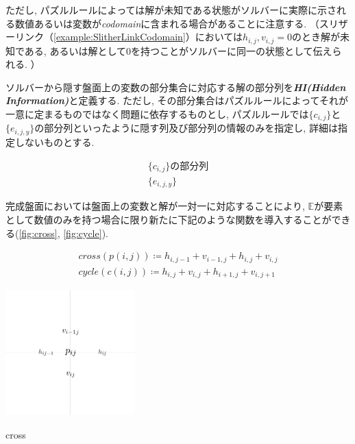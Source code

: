 ただし, パズルルールによっては解が未知である状態がソルバーに実際に示される数値あるいは変数が\textit{codomain}に含まれる場合があることに注意する. （スリザーリンク（\cref{example:SlitherLinkCodomain}）においては$h_{i,j}, v_{i,j} = 0$のとき解が未知である, あるいは解として0を持つことがソルバーに同一の状態として伝えられる. ）

\begin{definition}\label{definition:HiddenInformation}
  ソルバーから隠す盤面上の変数の部分集合に対応する解の部分列を\textbf{\textit{HI(Hidden Information)}}と定義する.
  ただし, その部分集合はパズルルールによってそれが一意に定まるものではなく問題に依存するものとし, パズルルールでは$\{c_{i,j}\}$と$\{e_{i,j,y}\}$の部分列といったように隠す列及び部分列の情報のみを指定し, 詳細は指定しないものとする.
\end{definition}

\begin{example}
  \begin{gather*}
    \{c_{i,j}\}の部分列 \\
    \{e_{i,j,y}\}
  \end{gather*}
\end{example}

完成盤面においては盤面上の変数と解が一対一に対応することにより, $\mathbb{E}$が要素として数値のみを持つ場合に限り新たに下記のような関数を導入することができる(\cref{fig:cross}, \cref{fig:cycle}).

\begin{definition}\label{definition:Function}
  \begin{gather*}
    \textit{cross}(p(i,j))\coloneqq h_{i,j-1}+v_{i-1,j}+h_{i,j}+v_{i,j} \\
    \textit{cycle}(c(i,j))\coloneqq h_{i,j}+v_{i,j}+h_{i+1,j}+v_{i,j+1}
  \end{gather*}
\end{definition}
\begin{clearpagefigure}
  \includegraphics[width=5cm]{fig/cross.png}
  \caption{cross}
  \label{fig:cross}
\end{clearpagefigure}

